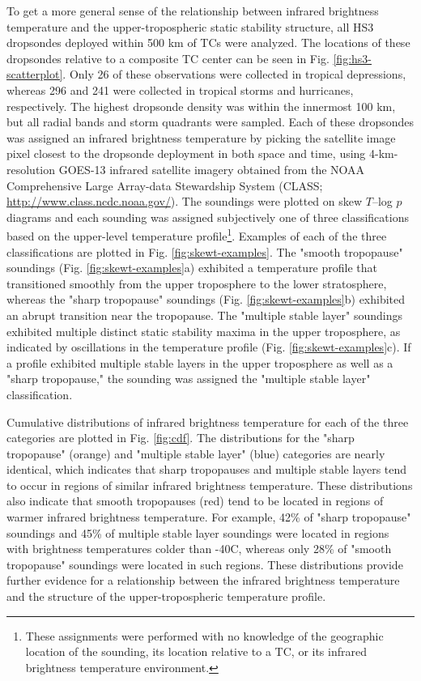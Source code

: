 To get a more general sense of the relationship between infrared brightness temperature and the upper-tropospheric static stability structure, all HS3 dropsondes deployed within 500 km of TCs were analyzed.
The locations of these dropsondes relative to a composite TC center can be seen in Fig. \ref{fig:hs3-scatterplot}.
Only 26 of these observations were collected in tropical depressions, whereas 296 and 241 were collected in tropical storms and hurricanes, respectively.
The highest dropsonde density was within the innermost 100 km, but all radial bands and storm quadrants were sampled.
Each of these dropsondes was assigned an infrared brightness temperature by picking the satellite image pixel closest to the dropsonde deployment in both space and time, using 4-km-resolution GOES-13 infrared satellite imagery obtained from the NOAA Comprehensive Large Array-data Stewardship System (CLASS; \url{http://www.class.ncdc.noaa.gov/}).
The soundings were plotted on skew $T$--log $p$ diagrams and each sounding was assigned subjectively one of three classifications based on the upper-level temperature profile\footnote{These assignments were performed with no knowledge of the geographic location of the sounding, its location relative to a TC, or its infrared brightness temperature environment.}.
Examples of each of the three classifications are plotted in Fig. \ref{fig:skewt-examples}.
The "smooth tropopause" soundings (Fig. \ref{fig:skewt-examples}a) exhibited a temperature profile that transitioned smoothly from the upper troposphere to the lower stratosphere, whereas the "sharp tropopause" soundings (Fig. \ref{fig:skewt-examples}b) exhibited an abrupt transition near the tropopause.
The "multiple stable layer" soundings exhibited multiple distinct static stability maxima in the upper troposphere, as indicated by oscillations in the temperature profile (Fig. \ref{fig:skewt-examples}c).
If a profile exhibited multiple stable layers in the upper troposphere as well as a "sharp tropopause," the sounding was assigned the "multiple stable layer" classification.

Cumulative distributions of infrared brightness temperature for each of the three categories are plotted in Fig. \ref{fig:cdf}.
The distributions for the "sharp tropopause" (orange) and "multiple stable layer" (blue) categories are nearly identical, which indicates that sharp tropopauses and multiple stable layers tend to occur in regions of similar infrared brightness temperature.
These distributions also indicate that smooth tropopauses (red) tend to be located in regions of warmer infrared brightness temperature.
For example, 42\% of "sharp tropopause" soundings and 45\% of multiple stable layer soundings were located in regions with brightness temperatures colder than -40\textdegree{}C, whereas only 28\% of "smooth tropopause" soundings were located in such regions.
These distributions provide further evidence for a relationship between the infrared brightness temperature and the structure of the upper-tropospheric temperature profile.

